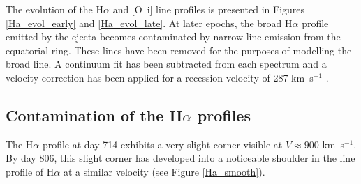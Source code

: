 \documentclass[useAMS,usenatbib,usegraphicx]{mnras}
\begin{document}
The evolution of the H$\alpha$ and [O~{\sc i}] line profiles is presented in Figures 
\ref{Ha_evol_early} and \ref{Ha_evol_late}.  At later epochs, the broad H$\alpha$ profile emitted by the ejecta becomes contaminated by narrow line emission 
from the equatorial ring.  These lines have been removed for the purposes 
of modelling the broad line. A continuum fit has been subtracted from each 
spectrum and a velocity correction has been applied for a recession 
velocity of 287 km~s$^{-1}$ \citep{Groningsson2008}.


\subsection{Contamination of the H$\alpha$ profiles}


The H$\alpha$ profile at day 714 exhibits a very slight corner visible at $V \approx 900$ km~s$^{-1}$.  By day 806, this slight corner has developed into a noticeable shoulder in the line profile of H$\alpha$ at a similar velocity (see Figure \ref{Ha_smooth}).
\end{document}
